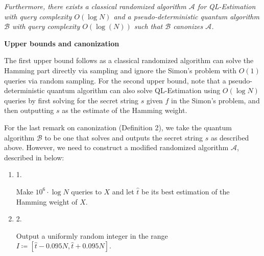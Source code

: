 \emph{Furthermore, there exists a classical randomized algorithm $\mathcal{A}$ for QL-Estimation with query complexity $O(\log N)$ and a pseudo-deterministic quantum algorithm $\mathcal{B}$ with query complexity $O(\log(N))$ such that $\mathcal{B}$ canonizes $\mathcal{A}$.}\par







\par\medskip\noindent\textbf{Upper bounds and canonization}\par




The first upper bound follows as a classical randomized algorithm can solve the Hamming part directly via sampling and ignore the Simon’s problem with $O(1)$ queries via random sampling. For the second upper bound, note that a pseudo-deterministic quantum algorithm can also solve QL-Estimation using $O(\log N)$ queries by first solving for the secret string $s$ given $f$ in the Simon’s problem, and then outputting ${s}$ as the estimate of the Hamming weight.\par




For the last remark on canonization (Definition 2), we take the quantum algorithm $\mathcal{B}$ to be one that solves and outputs the secret string $s$ as described above.
However, we need to construct a modified randomized algorithm $\mathcal{A}$, described in below:\par


\begin{enumerate}


\item[] 
1. 


Make $10^{6}\cdot\log N$ queries to $X$ and let $\hat{t}$ be its best estimation of the Hamming weight of $X$.\par





\item[] 
2. 


Output a uniformly random integer in the range $I\coloneqq[\hat{t}-0.095N,\hat{t}+0.095N]$.\par





\end{enumerate}




